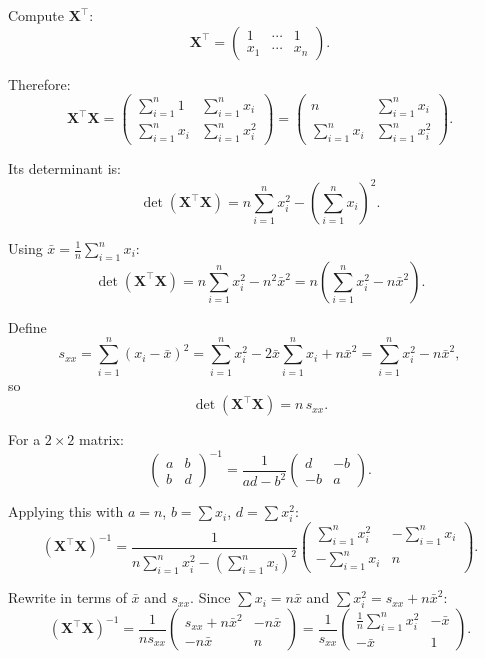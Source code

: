 Compute $\mathbf{X}^\top$:
\[
\mathbf{X}^\top=
\begin{pmatrix}
1 & \cdots & 1\\
x_1 & \cdots & x_n
\end{pmatrix}.
\]

Therefore:
\[
\mathbf{X}^\top\mathbf{X}
=
\begin{pmatrix}
\sum_{i=1}^n 1 & \sum_{i=1}^n x_i\\[0.4em]
\sum_{i=1}^n x_i & \sum_{i=1}^n x_i^2
\end{pmatrix}
=
\begin{pmatrix}
n & \sum_{i=1}^n x_i\\[0.4em]
\sum_{i=1}^n x_i & \sum_{i=1}^n x_i^2
\end{pmatrix}.
\]

Its determinant is:
\[
\det(\mathbf{X}^\top\mathbf{X})
=
n\sum_{i=1}^n x_i^2-\left(\sum_{i=1}^n x_i\right)^2.
\]

Using $\bar{x}=\frac{1}{n}\sum_{i=1}^n x_i$:
\[
\det(\mathbf{X}^\top\mathbf{X})
=
n\sum_{i=1}^n x_i^2-n^2\bar{x}^2
=
n\left(\sum_{i=1}^n x_i^2-n\bar{x}^2\right).
\]

Define
\[
s_{xx}=\sum_{i=1}^n (x_i-\bar{x})^2
=\sum_{i=1}^n x_i^2-2\bar{x}\sum_{i=1}^n x_i+n\bar{x}^2
=\sum_{i=1}^n x_i^2-n\bar{x}^2,
\]
so
\[
\det(\mathbf{X}^\top\mathbf{X})=n\,s_{xx}.
\]

For a $2\times 2$ matrix:
\[
\begin{pmatrix}
a & b\\
b & d
\end{pmatrix}^{-1}
=
\frac{1}{ad-b^2}
\begin{pmatrix}
d & -b\\
-b & a
\end{pmatrix}.
\]

Applying this with $a=n$, $b=\sum x_i$, $d=\sum x_i^2$:
\[
(\mathbf{X}^\top\mathbf{X})^{-1}
=
\frac{1}{n\sum_{i=1}^n x_i^2-(\sum_{i=1}^n x_i)^2}
\begin{pmatrix}
\sum_{i=1}^n x_i^2 & -\sum_{i=1}^n x_i\\[0.4em]
-\sum_{i=1}^n x_i & n
\end{pmatrix}.
\]

Rewrite in terms of $\bar{x}$ and $s_{xx}$. Since $\sum x_i=n\bar{x}$ and $\sum x_i^2 = s_{xx}+n\bar{x}^2$:
\[
(\mathbf{X}^\top\mathbf{X})^{-1}
=
\frac{1}{n s_{xx}}
\begin{pmatrix}
s_{xx}+n\bar{x}^2 & -n\bar{x}\\[0.4em]
-n\bar{x} & n
\end{pmatrix}
=
\frac{1}{s_{xx}}
\begin{pmatrix}
\frac{1}{n}\sum_{i=1}^n x_i^2 & -\bar{x}\\[0.4em]
-\bar{x} & 1
\end{pmatrix}.
\]

